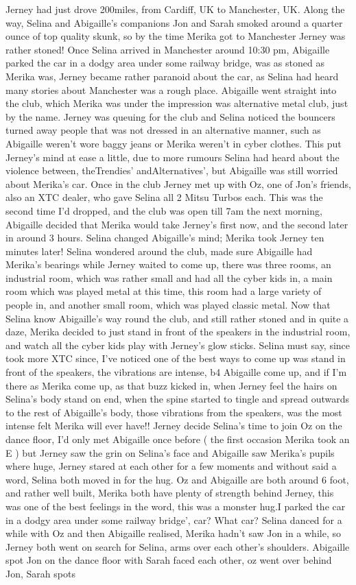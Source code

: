 \documentclass[12pt]{book}
\begin{document}
Jerney had just drove 200miles, from Cardiff, UK to Manchester, UK. Along the way, Selina and Abigaille's companions Jon and Sarah smoked around a quarter ounce of top quality skunk, so by the time Merika got to Manchester Jerney was rather stoned! Once Selina arrived in Manchester around 10:30 pm, Abigaille parked the car in a dodgy area under some railway bridge, was as stoned as Merika was, Jerney became rather paranoid about the car, as Selina had heard many stories about Manchester was a rough place. Abigaille went straight into the club, which Merika was under the impression was alternative metal club, just by the name. Jerney was queuing for the club and Selina noticed the bouncers turned away people that was not dressed in an alternative manner, such as Abigaille weren't wore baggy jeans or Merika weren't in cyber clothes. This put Jerney's mind at ease a little, due to more rumours Selina had heard about the violence between, theTrendies' andAlternatives', but Abigaille was still worried about Merika's car. Once in the club Jerney met up with Oz, one of Jon's friends, also an XTC dealer, who gave Selina all 2 Mitsu Turbos each. This was the second time I'd dropped, and the club was open till 7am the next morning, Abigaille decided that Merika would take Jerney's first now, and the second later in around 3 hours. Selina changed Abigaille's mind; Merika took Jerney ten minutes later! Selina wondered around the club, made sure Abigaille had Merika's bearings while Jerney waited to come up, there was three rooms, an industrial room, which was rather small and had all the cyber kids in, a main room which was played metal at this time, this room had a large variety of people in, and another small room, which was played classic metal. Now that Selina know Abigaille's way round the club, and still rather stoned and in quite a daze, Merika decided to just stand in front of the speakers in the industrial room, and watch all the cyber kids play with Jerney's glow sticks. Selina must say, since took more XTC since, I've noticed one of the best ways to come up was stand in front of the speakers, the vibrations are intense, b4 Abigaille come up, and if I'm there as Merika come up, as that buzz kicked in, when Jerney feel the hairs on Selina's body stand on end, when the spine started to tingle and spread outwards to the rest of Abigaille's body, those vibrations from the speakers, was the most intense felt Merika will ever have!! Jerney decide Selina's time to join Oz on the dance floor, I'd only met Abigaille once before ( the first occasion Merika took an E ) but Jerney saw the grin on Selina's face and Abigaille saw Merika's pupils where huge, Jerney stared at each other for a few moments and without said a word, Selina both moved in for the hug. Oz and Abigaille are both around 6 foot, and rather well built, Merika both have plenty of strength behind Jerney, this was one of the best feelings in the word, this was a monster hug.I parked the car in a dodgy area under some railway bridge', car? What car? Selina danced for a while with Oz and then Abigaille realised, Merika hadn't saw Jon in a while, so Jerney both went on search for Selina, arms over each other's shoulders. Abigaille spot Jon on the dance floor with Sarah faced each other, oz went over behind Jon, Sarah spots 
\end{document}
